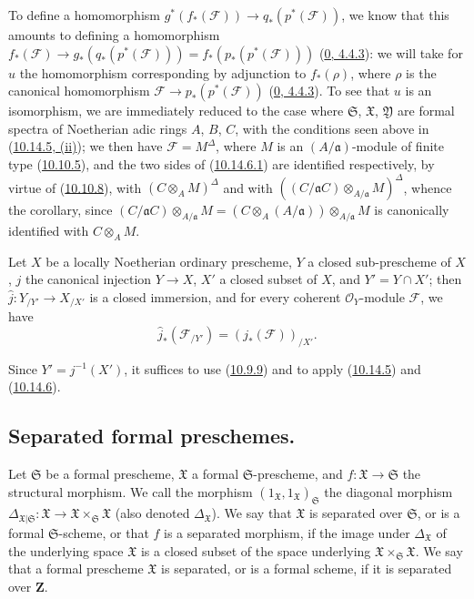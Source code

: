 To define a homomorphism
$g^*(f_*(\mathscr{F}))\to q_*(p^*(\mathscr{F}))$, we know that this amounts
to defining a homomorphism
$f_*(\mathscr{F})\to g_*(q_*(p^*(\mathscr{F})))
=f_*(p_*(p^*(\mathscr{F})))$
(\hyperref[0.4.4.3]{0, 4.4.3}): we will take for $u$ the homomorphism
corresponding by adjunction to $f_*(\rho)$, where $\rho$
is the canonical homomorphism
$\mathscr{F}\to p_*(p^*(\mathscr{F}))$
(\hyperref[0.4.4.3]{0, 4.4.3}). To see that $u$ is an isomorphism, we
are immediately reduced to the case where $\mathfrak{S}$, $\mathfrak{X}$,
$\mathfrak{Y}$ are formal spectra of Noetherian adic rings $A$,
$B$, $C$, with the conditions seen above in
(\hyperref[I.10.14.5]{10.14.5, (ii)}); we then have
$\mathscr{F}=M^\Delta$, where $M$ is an $(A/\mathfrak{a})$-module of finite
type (\hyperref[I.10.10.5]{10.10.5}), and the two sides of
(\hyperref[I.10.14.6.1]{10.14.6.1}) are identified respectively, by virtue
of (\hyperref[I.10.10.8]{10.10.8}), with
$(C\otimes_A M)^\Delta$ and with
$((C/\mathfrak{a}C)\otimes_{A/\mathfrak{a}}M)^\Delta$, whence the corollary,
since
$(C/\mathfrak{a}C)\otimes_{A/\mathfrak{a}}M
=(C\otimes_A(A/\mathfrak{a}))\otimes_{A/\mathfrak{a}}M$ is canonically
identified with $C\otimes_A M$.

\begin{corollary}[10.14.7]
\label{I.10.14.7}
Let $X$ be a locally Noetherian ordinary prescheme, $Y$ a closed
sub-prescheme of $X$, $j$ the canonical injection $Y\to X$, $X'$ a closed
subset of $X$, and $Y'=Y\cap X'$; then
$\widehat{j}:Y_{/Y'}\to X_{/X'}$ is a closed immersion, and for every
coherent $\mathscr{O}_Y$-module $\mathscr{F}$, we have
\[
  \widehat{j}_*(\mathscr{F}_{/Y'})=(j_*(\mathscr{F}))_{/X'}.
\]
\end{corollary}

Since $Y'=j^{-1}(X')$, it suffices to use
(\hyperref[I.10.9.9]{10.9.9}) and to apply
(\hyperref[I.10.14.5]{10.14.5}) and
(\hyperref[I.10.14.6]{10.14.6}).


\subsection{Separated formal preschemes.}
\label{subsection:I.10.15}

\begin{definition}[10.15.1]
\label{I.10.15.1}
Let $\mathfrak{S}$ be a formal prescheme, $\mathfrak{X}$ a formal
$\mathfrak{S}$-prescheme, and
$f:\mathfrak{X}\to\mathfrak{S}$ the structural morphism. We call the
morphism $(1_{\mathfrak{X}},1_{\mathfrak{X}})_{\mathfrak{S}}$ the
diagonal morphism
$\Delta_{\mathfrak{X}|\mathfrak{S}}:\mathfrak{X}\to
\mathfrak{X}\times_{\mathfrak{S}}\mathfrak{X}$ (also denoted
$\Delta_{\mathfrak{X}}$). We say that
$\mathfrak{X}$ is separated over $\mathfrak{S}$, or is a formal
$\mathfrak{S}$-scheme, or that $f$ is a separated morphism, if the image
under $\Delta_{\mathfrak{X}}$ of the underlying space $\mathfrak{X}$ is a
closed subset of the space underlying
$\mathfrak{X}\times_{\mathfrak{S}}\mathfrak{X}$. We say that a formal
prescheme $\mathfrak{X}$ is separated, or is a formal scheme, if it is
separated over $\mathbf{Z}$.
\end{definition}

